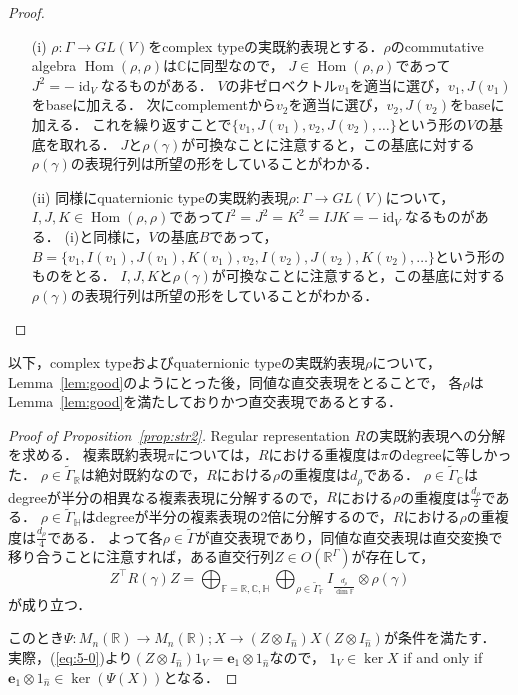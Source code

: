 \documentclass[11pt]{article}
\theoremstyle{definition}
\DeclareMathOperator{\id}{id}
\DeclareMathOperator{\Hom}{Hom}
\begin{document}
    \begin{proof}
        \begin{itemize}
            \item[(i)] $\rho:\Gamma \rightarrow GL(V)$をcomplex typeの実既約表現とする．$\rho$のcommutative algebra $\Hom (\rho, \rho)$は$\mathbb{C}$に同型なので，
            $J \in \Hom (\rho, \rho)$であって$J^2=- \id_V$なるものがある．
            $V$の非ゼロベクトル$v_1$を適当に選び，$v_1, J(v_1)$をbaseに加える．
            次にcomplementから$v_2$を適当に選び，$v_2, J(v_2)$をbaseに加える．
            これを繰り返すことで$\{v_1, J(v_1), v_2, J(v_2), \ldots \}$という形の$V$の基底を取れる．
            $J$と$\rho(\gamma)$が可換なことに注意すると，この基底に対する$\rho(\gamma)$の表現行列は所望の形をしていることがわかる．
            \item[(ii)] 同様にquaternionic typeの実既約表現$\rho:\Gamma \rightarrow GL(V)$について，
            $I,J,K \in \Hom(\rho,\rho)$であって$I^2=J^2=K^2=IJK=-\id_V$なるものがある．
            (i)と同様に，$V$の基底$B$であって，$B=\{v_1, I(v_1), J(v_1), K(v_1), v_2, I(v_2), J(v_2), K(v_2), \ldots \}$という形のものをとる．
            $I,J,K$と$\rho(\gamma)$が可換なことに注意すると，この基底に対する$\rho(\gamma)$の表現行列は所望の形をしていることがわかる．
        \end{itemize}
    \end{proof}
    以下，complex typeおよびquaternionic typeの実既約表現$\rho$について，Lemma~\ref{lem:good}のようにとった後，同値な直交表現をとることで，
    各$\rho$はLemma~\ref{lem:good}を満たしておりかつ直交表現であるとする．
    \begin{proof}[Proof of Proposition~\ref{prop:str2}]
        Regular representation $R$の実既約表現への分解を求める．
        複素既約表現$\pi$については，$R$における重複度は$\pi$のdegreeに等しかった．
        $\rho \in \tilde{\Gamma}_\mathbb{R}$は絶対既約なので，$R$における$\rho$の重複度は$d_\rho$である．
        $\rho \in \tilde{\Gamma}_\mathbb{C}$はdegreeが半分の相異なる複素表現に分解するので，$R$における$\rho$の重複度は$\frac{d_\rho}{2}$である．
        $\rho \in \tilde{\Gamma}_\mathbb{H}$はdegreeが半分の複素表現の2倍に分解するので，$R$における$\rho$の重複度は$\frac{d_\rho}{4}$である．
        よって各$\rho \in \tilde{\Gamma}$が直交表現であり，同値な直交表現は直交変換で移り合うことに注意すれば，ある直交行列$Z \in O(\mathbb{R}^\Gamma)$が存在して，
        \begin{equation} \label{eq:5-0}
            Z^\top R(\gamma) Z = \bigoplus_{\mathbb{F}= \mathbb{R}, \mathbb{C}, \mathbb{H}} \bigoplus_{\rho \in \tilde{\Gamma}_\mathbb{F}} 
            I_{ \frac{d_\rho}{\dim \mathbb{F}}} \otimes \rho(\gamma)
        \end{equation}
        が成り立つ．
        
        このとき$\Psi:M_n(\mathbb{R}) \rightarrow M_n(\mathbb{R}); X \rightarrow (Z \otimes I_{\hat{n}})X(Z \otimes I_{\hat{n}})$が条件を満たす．
        実際，(\ref{eq:5-0})より$(Z\otimes I_{\hat{n}}) 1_V = \bm{e}_1 \otimes 1_{\hat{n}}$なので，
        $1_V \in \ker X$ if and only if $\bm{e}_1 \otimes 1_{\hat{n}} \in \ker(\Psi(X))$となる．
    \end{proof}
\end{document}
